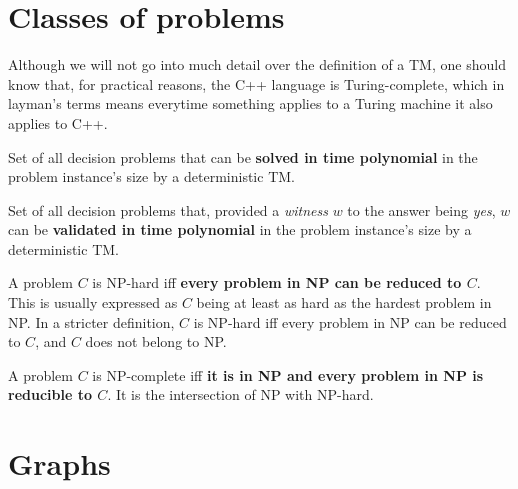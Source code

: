 \section{Classes of problems} \label{classes-problems}
Although we will not go into much detail over the definition of a \acrfull*{TM}, one should know that, for practical reasons, the C++ language is Turing-complete, which in layman's terms means everytime something applies to a Turing machine it also applies to C++.
\begin{definition}[P]
    Set of all decision problems that can be \textbf{solved in time polynomial} in the problem instance's size by a deterministic \acrshort{TM}.
\end{definition}
\begin{definition}[NP]
    Set of all decision problems that, provided a \emph{witness} $w$ to the answer being \emph{yes}, $w$ can be \textbf{validated in time polynomial} in the problem instance's size by a deterministic \acrshort{TM}.
\end{definition}
\begin{definition}[NP-hard]
    A problem $C$ is NP-hard iff \textbf{every problem in NP can be reduced to $C$}. This is usually expressed as $C$ being at least as hard as the hardest problem in NP. In a stricter definition, $C$ is NP-hard iff every problem in NP can be reduced to $C$, and $C$ does not belong to NP.
\end{definition}
\begin{definition}[NP-complete]
    A problem $C$ is NP-complete iff \textbf{it is in NP and every problem in NP is reducible to $C$}. It is the intersection of NP with NP-hard.
\end{definition}

\section{Graphs} \label{graphs}
